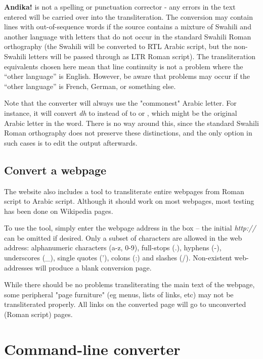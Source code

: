 \textbf{Andika!} is not a spelling or punctuation corrector - any errors in the text entered will be carried over into the transliteration.
The conversion may contain lines with out-of-sequence words if the source contains a mixture of Swahili and another language with letters that do not occur in the standard Swahili Roman orthography (the Swahili will be converted to RTL Arabic script, but the non-Swahili letters will be passed through as LTR Roman script). The transliteration equivalents chosen here mean that line continuity is not a problem where the ``other language'' is English. However, be aware that problems may occur if the ``other language'' is French, German, or something else.

Note that the converter will always use the "commonest" Arabic letter. For instance, it will convert \textit{dh} to  instead of to  or , which might be the original Arabic letter in the word. There is no way around this, since the standard Swahili Roman orthography does not preserve these distinctions, and the only option in such cases is to edit the output afterwards.

\subsection{Convert a webpage}

The website also includes a tool to transliterate entire webpages from Roman script to Arabic script.  Although it should work on most webpages, most testing has been done on Wikipedia pages.

To use the tool, simply enter the webpage address in the box -- the initial \textit{http://} can be omitted if desired.  Only a subset of characters are allowed in the web address: alphanumeric characters (a-z, 0-9), full-stops (.), hyphens (-), underscores (\_), single quotes ('), colons (:) and slashes (/).  Non-existent web-addresses will produce a blank conversion page.

While there should be no problems transliterating the main text of the webpage, some peripheral "page furniture" (eg menus, lists of links, etc) may not be transliterated properly.  All links on the converted page will go to unconverted (Roman script) pages. 



\section{Command-line converter}
\label{s:cliconvert}

